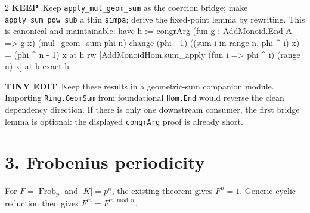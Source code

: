 \documentclass[9pt]{article}
\newenvironment{lean}{\Verbatim[fontsize=\scriptsize,frame=single,framesep=1.2mm,formatcom=\leanfont]}{\endVerbatim}
\newcommand{\good}{\textcolor{keep}{\bfseries KEEP}}
\newcommand{\edit}{\textcolor{change}{\bfseries TINY EDIT}}
\begin{document}
\begin{multicols}{2}
\good\ Keep \texttt{apply\_mul\_geom\_sum} as the coercion bridge; make
\texttt{apply\_sum\_pow\_sub} a thin \texttt{simpa}; derive the fixed-point
lemma by rewriting.  This is canonical and maintainable:
\begin{lean}
have h := congrArg (fun g : AddMonoid.End A => g x)
  (mul_geom_sum phi n)
change (phi - 1) ((sum i in range n, phi ^ i) x) =
  (phi ^ n - 1) x at h
rw [AddMonoidHom.sum_apply
  (fun i => phi ^ i) (range n) x] at h
exact h
\end{lean}

\edit\ Keep these results in a geometric-sum companion module.  Importing
\texttt{Ring.GeomSum} from foundational \texttt{Hom.End} would reverse the
clean dependency direction.  If there is only one downstream consumer, the
first bridge lemma is optional: the displayed \texttt{congrArg} proof is
already short.
\end{multicols}

\newpage
\section*{3. Frobenius periodicity}
For $F=\operatorname{Frob}_p$ and $|K|=p^n$, the existing theorem gives
$F^n=1$.  Generic cyclic reduction then gives $F^m=F^{m\bmod n}$.

\begin{center}
\end{center}
\end{document}
